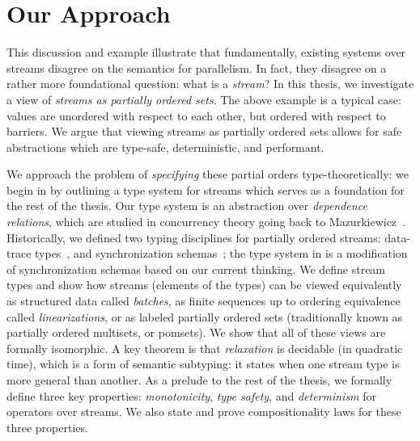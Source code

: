 \section{Our Approach}

This discussion and example illustrate that fundamentally, existing systems over streams disagree on the semantics for parallelism.
In fact, they disagree on a rather more foundational question: what is a \emph{stream}?
In this thesis, we investigate a view of \emph{streams as partially ordered sets}.
The above example is a typical case: values are unordered with respect to each other, but ordered with respect to barriers.
We argue that viewing streams as partially ordered sets allows for safe abstractions which are type-safe, deterministic, and performant.

We approach the problem of \emph{specifying} these partial orders type-theoretically: we begin in  by
outlining a type system for streams which serves as a foundation for the rest of the thesis.
Our type system is an abstraction over \emph{dependence relations},
which are studied in concurrency theory going back to Mazurkiewicz~\cite{mazurkiewicz1986trace}.
Historically, we defined two typing disciplines for partially ordered streams:
data-trace types~,
and synchronization schemas~;
the type system in  is a modification of synchronization schemas based on our current thinking.
We define stream types and show how streams (elements of the types) can be viewed equivalently as structured data called \emph{batches}, as finite sequences up to ordering equivalence called \emph{linearizations}, or as labeled partially ordered sets (traditionally known as partially ordered multisets, or pomsets).
We show that all of these views are formally isomorphic.
A key theorem is that \emph{relaxation} is decidable (in quadratic time), which is a form of semantic subtyping: it states when one stream type is more general than another.
As a prelude to the rest of the thesis, we formally define three key properties: \emph{monotonicity}, \emph{type safety}, and \emph{determinism} for operators over streams.
We also state and prove compositionality laws for these three properties.


